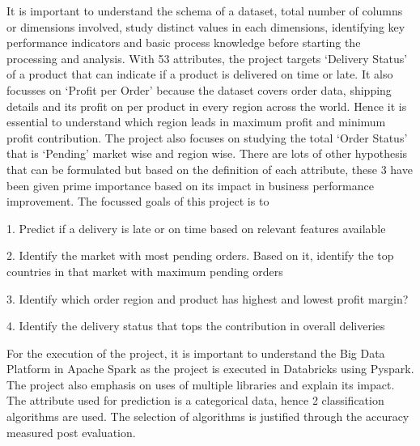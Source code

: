 \documentclass[journal,twoside,web]{ieeecolor}
\begin{document}
It is important to understand the schema of a dataset, total number of columns or dimensions involved, study distinct values in each dimensions, identifying key performance indicators and basic process knowledge before starting the processing and analysis. With 53 attributes, the project targets ‘Delivery Status’ of a product that can indicate if a product is delivered on time or late. It also focusses on ‘Profit per Order’ because the dataset covers order data, shipping details and its profit on per product in every region across the world. Hence it is essential to understand which region leads in maximum profit and minimum profit contribution. The project also focuses on studying the total ‘Order Status’ that is ‘Pending’ market wise and region wise. There are lots of other hypothesis that can be formulated but based on the definition of each attribute, these 3 have been given prime importance based on its impact in business performance improvement. The focussed goals of this project is to

1.	Predict if a delivery is late or on time based on relevant features available

2.	Identify the market with most pending orders. Based on it, identify the top countries in that market with maximum pending orders

3.	Identify which order region and product has highest and lowest profit margin?

4.	Identify the delivery status that tops the contribution in overall deliveries


For the execution of the project, it is important to understand the Big Data Platform in Apache Spark as the project is executed in Databricks using Pyspark. The project also emphasis on uses of multiple libraries and explain its impact. The attribute used for prediction is a categorical data, hence 2 classification algorithms are used. The selection of algorithms is justified through the accuracy measured post evaluation.
\end{document}
